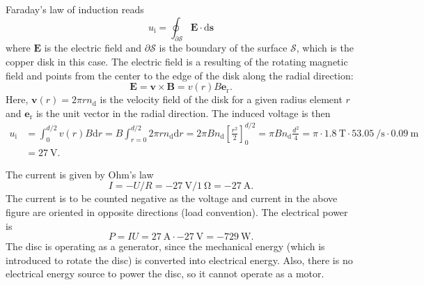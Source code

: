 \begin{solutionblock}
    Faraday's law of induction reads 
    $$u_\mathrm{i} =\oint_{\partial\mathcal{S}} \bm{E} \cdot \mathrm{d}\bm{s}$$ 
    where $\bm{E}$ is the electric field and $\partial\mathcal{S}$ is the boundary of the surface $\mathcal{S}$, which is the copper disk in this case. The electric field is a resulting of the rotating magnetic field and points from the center to the edge of the disk along the radial direction:
    $$\bm{E} = \bm{v} \times \bm{B} = v(r) B \bm{e}_\mathrm{r} .$$
    Here, $\bm{v}(r) = 2 \pi r n_\mathrm{d}$ is the velocity field of the disk for a given radius element $r$ and $\bm{e}_\mathrm{r}$ is the unit vector in the radial direction. The induced voltage is then
    \begin{align*}
        u_\mathrm{i} &= \int_{0}^{d/2} v(r) B \mathrm{d}r = B \int_{r=0}^{d/2} 2 \pi r n_\mathrm{d} \mathrm{d}r = 2 \pi Bn_\mathrm{d} \left[\frac{r^2}{2}\right]_{0}^{d/2} = \pi B n_\mathrm{d} \frac{d^2}{4} = \pi \cdot \SI{1.8}{\tesla} \cdot \SI{53.05}{\per\second}\cdot \SI{0.09}{\meter} \\&= \SI{27}{\volt}.
    \end{align*}
\end{solutionblock}


\begin{solutionblock}
    The current is given by Ohm's law $$I = -U/R = \SI{-27}{\volt}/\SI{1}{\ohm} = \SI{-27}{\ampere}.$$ The current is to be counted negative as the voltage and current in the above figure are oriented in opposite directions (load convention). The electrical power is $$P = I U = \SI{27}{\ampere} \cdot \SI{-27}{\volt} = \SI{-729}{\watt}.$$ The disc is operating as a generator, since the mechanical energy (which is introduced to rotate the disc) is converted into electrical energy. Also, there is no electrical energy source to power the disc, so it cannot operate as a motor.
\end{solutionblock}



